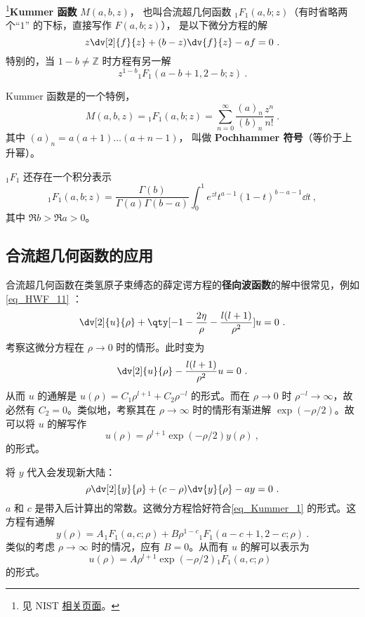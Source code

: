 \begin{issues}
\issueDraft
\end{issues}

\footnote{见 NIST \href{https://dlmf.nist.gov/13.2}{相关页面}。}\textbf{Kummer 函数} $M(a, b, z)$， 也叫合流超几何函数 $_1F_1(a, b; z)$（有时省略两个“$1$” 的下标，直接写作 $F(a, b; z)$）， 是以下微分方程的解
\begin{equation}\label{eq_Kummer_1}
z\dv[2]{f}{z} + (b-z)\dv{f}{z} - a f = 0~.
\end{equation}
特别的，当 $1 - b \neq \mathbb Z$ 时方程有另一解
$$z^{1-b} {_1F_1}(a-b+1, 2-b; z)~.$$

Kummer 函数是的一个特例， 
\begin{equation}
M(a, b, z) = {_1F_1}(a, b; z) = \sum_{n=0}^\infty \frac{(a)_n}{(b)_n} \frac{z^n}{n!}~.
\end{equation}
其中 $(a)_n = a(a+1)\dots(a+n-1)$， 叫做 \textbf{Pochhammer 符号}（等价于上升幂）。

${_1F_1}$ 还存在一个积分表示
\begin{equation}
{_1F_1}(a, b; z) = \frac{\Gamma(b)}{\Gamma(a) \Gamma(b-a)} \int_0^1 {e^{zt} t^{a-1} (1-t)^{b-a-1}\dd t} ~,
\end{equation}
其中 $\Re b > \Re a > 0$。

\subsection{合流超几何函数的应用}
合流超几何函数在类氢原子束缚态的薛定谔方程的\textbf{径向波函数}的解中很常见，例如\autoref{eq_HWF_11} ：
\begin{equation}
\dv[2]{u}{\rho} + \qty[-1 - \frac{2\eta}{\rho} - \frac{l(l+1)}{\rho^2}]u = 0~.
\end{equation}
考察这微分方程在 $\rho \rightarrow 0$ 时的情形。此时变为
\begin{equation}
\dv[2]{u}{\rho} - \frac{l(l+1)}{\rho^2} u = 0 ~.
\end{equation}
从而 $u$ 的通解是 $u(\rho) = C_1 \rho^{l+1} + C_2 \rho^{-l}$ 的形式。而在 $\rho \rightarrow 0$ 时 $\rho^{-l} \rightarrow \infty$，故必然有 $C_2 = 0$。类似地，考察其在 $\rho \rightarrow \infty$ 时的情形有渐进解 $\exp(-\rho/2)$。故可以将 $u$ 的解写作
\begin{equation}
u(\rho) = \rho^{l+1} \exp(-\rho/2) y(\rho) ~,
\end{equation}
的形式。

将 $y$ 代入会发现新大陆：
\begin{equation}
\rho \dv[2]{y}{\rho} + (c-\rho)\dv{y}{\rho} -ay = 0 ~.
\end{equation}
$a$ 和 $c$ 是带入后计算出的常数。这微分方程恰好符合\autoref{eq_Kummer_1} 的形式。这方程有通解
\begin{equation}
y(\rho) = A_{} {}_{1}F_1(a, c; \rho) + B \rho^{1-c}{}  _{1}F_{1}(a-c+1, 2-c; \rho) ~.
\end{equation}
类似的考虑 $\rho\rightarrow \infty$ 时的情况，应有 $B=0$。从而有 $u$ 的解可以表示为
\begin{equation}
u(\rho) = A \rho^{l+1} \exp(-\rho/2) {_1F_1}(a, c; \rho) ~~
\end{equation}
的形式。
